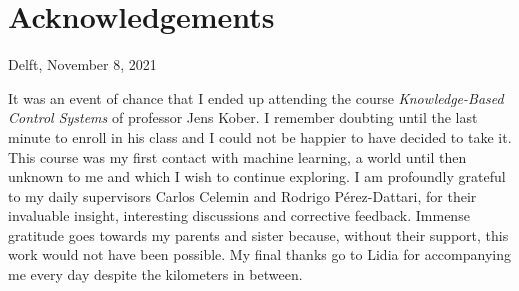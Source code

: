 \chapter*{Acknowledgements}


 \vspace{2cm} 

\begin{flushright}
Delft, November 8, 2021
\end{flushright}

 \vspace{3mm} 

It was an event of chance that I ended up attending the course \textit{Knowledge-Based Control Systems} of professor Jens Kober. I remember doubting until the last minute to enroll in his class and I could not be happier to have decided to take it. This course was my first contact with machine learning, a world until then unknown to me and which I wish to continue exploring. I am profoundly grateful to my daily supervisors Carlos Celemin and Rodrigo Pérez-Dattari, for their invaluable insight, interesting discussions and corrective feedback. Immense gratitude goes towards my parents and sister because, without their support, this work would not have been possible.
My final thanks go to Lidia for accompanying me every day despite the kilometers in between. 


 \vspace{5mm} 



